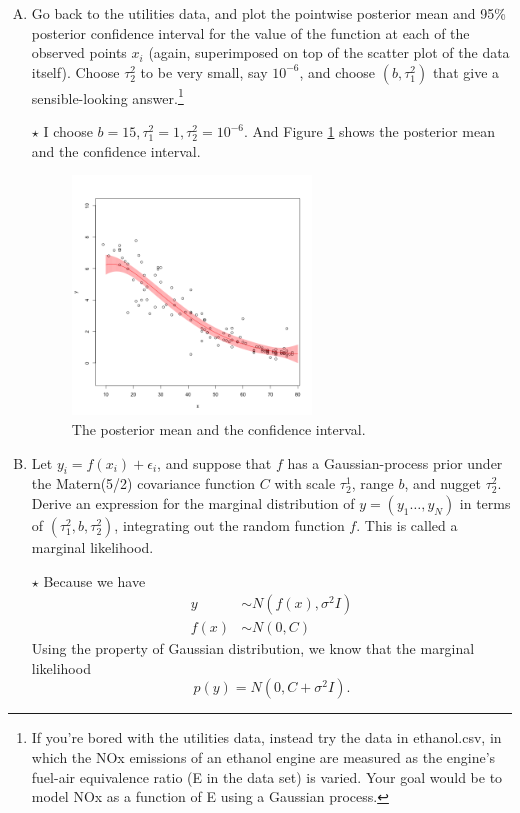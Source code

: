 \documentclass[11pt]{article}
\newcommand{\jie}{$\star$ }
\begin{document}
\begin{enumerate}[(A)]
\item Go back to the utilities data, and plot the pointwise posterior mean and 95\% posterior confidence interval for the value of the function at each of the observed points $x_i$ (again, superimposed on top of the scatter plot of the data itself).  Choose $\tau^2_2$ to be very small, say $10^{-6}$, and choose $(b, \tau^2_1)$ that give a sensible-looking answer.\footnote{If you're bored with the utilities data, instead try the data in ethanol.csv, in which the NOx emissions of an ethanol engine are measured as the engine's fuel-air equivalence ratio (E in the data set) is varied.  Your goal would be to model NOx as a function of E using a Gaussian process. }

\bigskip \jie
I choose $b =15, \tau_1^2 = 1, \tau_2^2 = 10^{-6}$. And Figure \ref{fig:CI_GP} shows the posterior mean and the confidence interval.

\begin{figure}[h]
    \centering
    \includegraphics[width=0.6\textwidth]{Ex6/figures/CI_GP.png}
    \caption{The posterior mean and the confidence interval.}
    \label{fig:CI_GP}
\end{figure}

\item Let $y_i = f(x_i) + \epsilon_i$, and suppose that $f$ has a Gaussian-process prior under the Matern(5/2) covariance function $C$ with scale $\tau^1_2$, range $b$, and nugget $\tau^2_2$.  Derive an expression for the marginal distribution of $y = (y_1 \ldots, y_N)$ in terms of $(\tau^2_1, b, \tau^2_2)$, integrating out the random function $f$.  This is called a marginal likelihood.

\bigskip \jie
Because we have
\begin{align*}
    y &\sim N(f(x), \sigma^2 I) \\
    f(x) &\sim N(0,C)
\end{align*}
Using the property of Gaussian distribution, we know that the marginal likelihood
$$p(y) = N(0, C + \sigma^2 I).$$


\end{enumerate}
\end{document}
